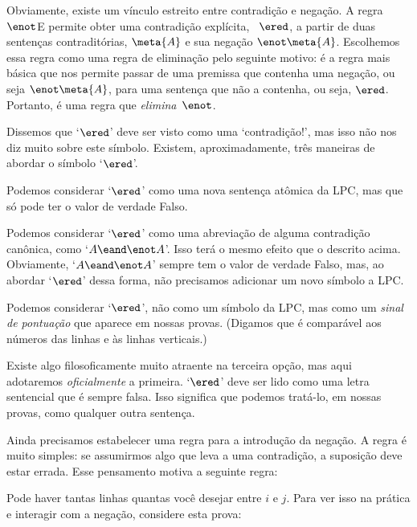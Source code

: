 
Obviamente, existe um vínculo estreito entre contradição e negação. 
A regra $\enot$E permite obter uma contradição explícita, ~$\ered$,  
 a partir de duas sentenças contraditórias, $\meta{A}$ e sua negação $\enot \meta{A}$. 
Escolhemos essa regra como uma regra de eliminação pelo seguinte  motivo: é a regra mais básica que nos permite passar de uma premissa que contenha uma negação, ou seja $\enot\meta{A}$, 
para uma sentença que não a contenha, ou seja,  $\ered$.  Portanto, é uma regra que \emph{elimina}~$\enot$.


Dissemos que  `$\ered$'  deve ser visto como uma  `contradição!', mas isso não nos diz muito sobre este símbolo. Existem, aproximadamente, três maneiras de abordar o símbolo `$\ered$'.
	\begin{ebullet}
		\item Podemos considerar `$\ered$' como uma nova sentença atômica da LPC, mas que só pode ter o valor de verdade Falso.  
		\item Podemos considerar  `$\ered$' como uma abreviação de alguma contradição canônica, como `$A \eand \enot A$'. Isso terá o mesmo efeito que o descrito acima. Obviamente, `$A \eand \enot A$' sempre tem o valor de verdade Falso, mas, ao abordar `$\ered$' dessa forma, não precisamos adicionar um novo símbolo a LPC.
		\item Podemos considerar `$\ered$', não como um símbolo da LPC, mas como um \emph{sinal de pontuação} que aparece em nossas provas.  (Digamos que é comparável aos números das linhas e às linhas verticais.)
			\end{ebullet}
			
Existe algo filosoficamente  muito atraente na terceira opção, mas aqui adotaremos \emph{oficialmente} a primeira. `$\ered$'  deve ser lido como uma letra sentencial que é sempre falsa. Isso significa que podemos tratá-lo, em nossas provas, como qualquer outra sentença.

Ainda precisamos estabelecer uma regra para a introdução da negação. A regra é muito simples: se assumirmos algo que leva a uma contradição, a suposição deve estar errada. Esse pensamento motiva a seguinte regra:

Pode haver tantas linhas quantas você desejar entre $i$ e $j$. Para ver isso na prática e interagir com a negação, considere esta prova: 
	\begin{fitchproof}
		\open
		\close
	\end{fitchproof}

